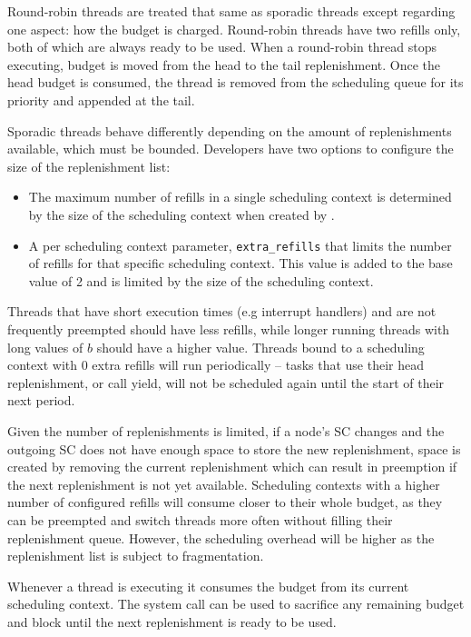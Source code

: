 Round-robin threads are treated that same as sporadic threads except regarding one aspect: how the
budget is charged. Round-robin threads have two refills only, both of which are always ready to be
used. When a round-robin thread stops executing, budget is moved from the head to the tail
replenishment. Once the head budget is consumed, the thread is removed from the scheduling queue
for its priority and appended at the tail.

Sporadic threads behave differently depending on the amount of replenishments available, which
must be bounded. Developers have two options to configure the size of the replenishment list:

\begin{itemize}
\item The maximum number of refills in a single scheduling context is determined by the size
      of the scheduling context when created by .
\item A per scheduling context parameter, \texttt{extra\_refills} that
limits the number of refills for that specific scheduling context. This value is added to the base
value of 2 and is limited by the size of the scheduling context.
\end{itemize}

Threads that have short execution times (e.g interrupt handlers) and are not frequently preempted
should have less refills, while longer running threads with long values of $b$ should have a higher
value. Threads bound to a scheduling context with 0 extra refills will run periodically -- tasks
that use their head replenishment, or call yield, will not be scheduled again until the start of
their next period.

Given the number of replenishments is limited, if a node's SC changes and the outgoing SC does not
have enough space to store the new replenishment, space is created by removing the current
replenishment which can result in preemption if the next replenishment is not yet available.
Scheduling contexts with a higher number of configured refills will consume closer
to their whole budget, as they can be preempted and switch threads more often without filling their
replenishment queue. However, the scheduling overhead will be higher as the replenishment list is
subject to fragmentation.

Whenever a thread is executing it consumes the budget from its current scheduling context.  The
system call  can be used to sacrifice any remaining budget and
block until the next replenishment is ready to be used.

